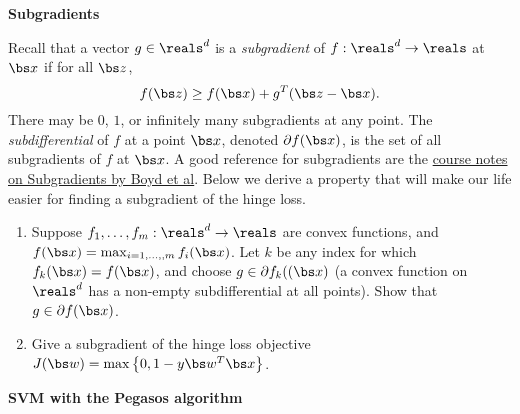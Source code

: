 \documentclass{article}
\newcommand{\nyuparagraph}[1]{\textcolor{nyupurple}{\large #1}}
\theoremstyle{plain}
\theoremstyle{definition}
\begin{document}
\nyuparagraph{\bf Subgradients} 

Recall that a vector $g\in\reals^{d}$ is a \emph{subgradient} of
$f:\reals^{d}\to\reals$ at $\bs x$ if for all $\bs z$, 
\[
f(\bs z)\ge f(\bs x)+g^{T}(\bs z- \bs x).
\]
There may be $0$, $1$, or infinitely many
subgradients at any point. The \emph{subdifferential} of $f$ at
a point $\bs x$, denoted $\partial f(\bs x)$, is the set of all subgradients
of $f$ at $\bs x$. 
  A good reference for subgradients are the \href{https://stanford.edu/class/ee364b/lectures/subgradients_notes.pdf}{course notes on Subgradients by Boyd et al}.
Below we derive a property
that will make our life easier for finding a subgradient of the hinge
loss.

\begin{enumerate}
  \setcounter{enumi}{\value{saveenum}}
\item Suppose $f_{1},\ldots,f_{m}:\reals^{d}\to\reals$
are convex functions, and 
$f(\bs x)=\max_{i=1,\ldots,,m}f_{i}(\bs x)$.
Let $k$ be any index for which $f_{k}(\bs x)=f(\bs x)$, and choose $g\in\partial f_{k}((\bs x)$ (a convex function on $\reals^{d}$ has
a non-empty subdifferential at all points). Show that $g\in\partial f(\bs x)$.

\item Give a subgradient of the hinge loss objective
$J(\bs w)=\max\left\{ 0,1-y \bs w^{T} \bs x\right\}$.
 
\setcounter{saveenum}{\value{enumi}}
\end{enumerate}

\nyuparagraph{\bf SVM with the Pegasos algorithm}
\end{document}
